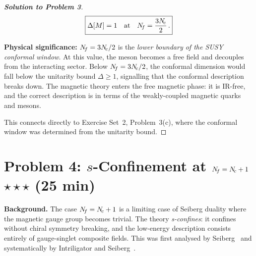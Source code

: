 \documentclass[11pt,a4paper]{article}
\begin{document}
\begin{proof}[\textbf{Solution to Problem 3}]
\[
  \boxed{\Delta[M] = 1 \quad\text{at}\quad N_{\!f} = \frac{3N_{\!c}}{2}\,.}
\]

\textbf{Physical significance:} $N_{\!f} = 3N_{\!c}/2$ is the \emph{lower
boundary of the SUSY conformal window}.  At this value, the meson
becomes a free field and decouples from the interacting sector.  Below
$N_{\!f} = 3N_{\!c}/2$, the conformal dimension would fall below the unitarity
bound $\Delta \geq 1$, signalling that the conformal description breaks
down.  The magnetic theory enters the free magnetic phase: it is
IR-free, and the correct description is in terms of the weakly-coupled
magnetic quarks and mesons.

This connects directly to Exercise Set~2, Problem~3(c), where the
conformal window was determined from the unitarity bound.
\end{proof}

\newpage


\section*{Problem 4: $s$-Confinement at $N_{\!f} = N_{\!c} + 1$
  \hfill $\star\star\star$ \normalsize(25 min)}
\label{prob:s-confinement}

\noindent\textbf{Background.}
The case $N_{\!f} = N_{\!c} + 1$ is a limiting case of Seiberg duality where the
magnetic gauge group becomes trivial.  The theory \emph{s-confines}:
it confines without chiral symmetry breaking, and the low-energy
description consists entirely of gauge-singlet composite fields.  This
was first analysed by Seiberg~\cite{Seiberg1995} and systematically
by Intriligator and Seiberg~\cite{IS1995}.

\medskip
\end{document}
